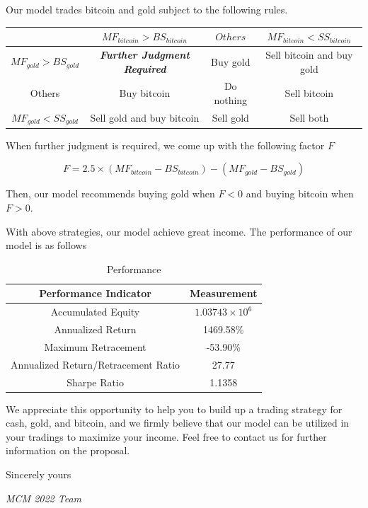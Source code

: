 \documentclass[12pt,a4paper]{article}
\begin{document}
\begin{spacing}{1.2}
\begin{enumerate}
	Our model trades bitcoin and gold subject to the following rules.
	
	\begin{center}
		\begin{tabular}{ |c|c|c|c| } 
			\hline
			 & $MF_{bitcoin} > BS_{bitcoin}$ & $Others$ & $MF_{bitcoin} < SS_{bitcoin}$ \\ 
			\hline
			$MF_{gold} > BS_{gold}$ & \textbf{\textit{Further Judgment Required}}  & Buy gold & Sell bitcoin and buy gold  \\ 
			\hline
			Others & Buy bitcoin & Do nothing & Sell bitcoin \\
			\hline
			$MF_{gold} < SS_{gold}$ & Sell gold and buy bitcoin & Sell gold & Sell both \\ 
			\hline
		\end{tabular}
	\end{center}

	When further judgment is required, we come up with the following factor $F$ 
	
	$$
	F=2.5 \times (MF_{bitcoin}-BS_{bitcoin})-(MF_{gold}-BS_{gold})
	$$
	
	Then, our model recommends buying gold when $F<0$ and buying bitcoin when $F>0$.
\end{enumerate}

With above strategies, our model achieve great income. The performance of our model is as follows

	\begin{table}[H]
	\renewcommand{\arraystretch}{1.5}
	\caption{Performance}
	\label{table:memo_performance}
	\begin{center}
		{\footnotesize
			\begin{tabular}{c c }
				\toprule
				Performance Indicator & Measurement\\
				\midrule
				Accumulated Equity & $1.03743 \times 10^6$ \\
				Annualized Return & 1469.58\% \\
				Maximum Retracement & -53.90\% \\
				Annualized Return/Retracement Ratio & 27.77 \\
				Sharpe Ratio & 1.1358 \\
				\bottomrule
		\end{tabular}}
	\end{center}	
\end{table}


We appreciate this opportunity to help you to build up a trading strategy for cash, gold, and bitcoin, and we firmly believe that our model can be utilized in your tradings to maximize your income. Feel free to contact us for further information on the proposal.

Sincerely yours

\textit{MCM 2022 Team}



\end{spacing}
\end{document}
